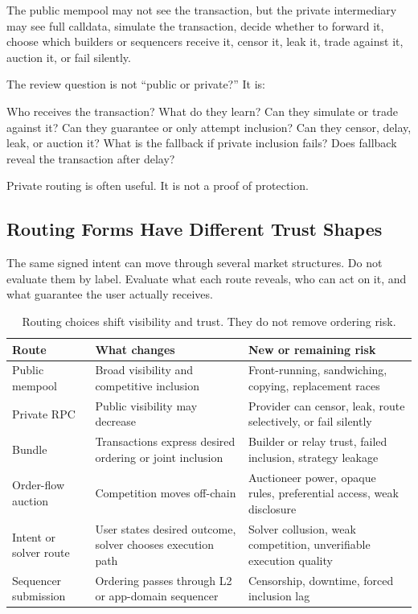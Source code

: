The public mempool may not see the transaction, but the private intermediary may see full calldata, simulate the transaction, decide whether to forward it, choose which builders or sequencers receive it, censor it, leak it, trade against it, auction it, or fail silently.

The review question is not ``public or private?'' It is:

\begin{codeblock}
Who receives the transaction?
What do they learn?
Can they simulate or trade against it?
Can they guarantee or only attempt inclusion?
Can they censor, delay, leak, or auction it?
What is the fallback if private inclusion fails?
Does fallback reveal the transaction after delay?
\end{codeblock}

Private routing is often useful. It is not a proof of protection.

\subsection{Routing Forms Have Different Trust Shapes}

The same signed intent can move through several market structures. Do not evaluate them by label. Evaluate what each route reveals, who can act on it, and what guarantee the user actually receives.

\begin{table}[htbp]
\centering
\small
\renewcommand{\arraystretch}{1.16}
\begin{tabularx}{\textwidth}{@{}>{\RaggedRight\arraybackslash}p{}>{\RaggedRight\arraybackslash}p{}X@{}}
\toprule
Route & What changes & New or remaining risk \\
\midrule
Public mempool & Broad visibility and competitive inclusion & Front-running, sandwiching, copying, replacement races \\
Private RPC & Public visibility may decrease & Provider can censor, leak, route selectively, or fail silently \\
Bundle & Transactions express desired ordering or joint inclusion & Builder or relay trust, failed inclusion, strategy leakage \\
Order-flow auction & Competition moves off-chain & Auctioneer power, opaque rules, preferential access, weak disclosure \\
Intent or solver route & User states desired outcome, solver chooses execution path & Solver collusion, weak competition, unverifiable execution quality \\
Sequencer submission & Ordering passes through L2 or app-domain sequencer & Censorship, downtime, forced inclusion lag \\
\bottomrule
\end{tabularx}
\caption{Routing choices shift visibility and trust. They do not remove ordering risk.}
\end{table}

